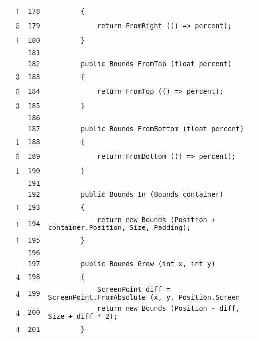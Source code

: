 \documentclass[a4paper,10pt]{article}
\begin{document}
\begin{longtable}[l]{lrrl}
\cellcolor{green} & 1 & \verb~178~ & \verb~        {~\\
\cellcolor{green} & 5 & \verb~179~ & \verb~            return FromRight (() => percent);~\\
\cellcolor{green} & 1 & \verb~180~ & \verb~        }~\\
\cellcolor{gray} &  & \verb~181~ & \verb~~\\
\cellcolor{gray} &  & \verb~182~ & \verb~        public Bounds FromTop (float percent)~\\
\cellcolor{green} & 3 & \verb~183~ & \verb~        {~\\
\cellcolor{green} & 5 & \verb~184~ & \verb~            return FromTop (() => percent);~\\
\cellcolor{green} & 3 & \verb~185~ & \verb~        }~\\
\cellcolor{gray} &  & \verb~186~ & \verb~~\\
\cellcolor{gray} &  & \verb~187~ & \verb~        public Bounds FromBottom (float percent)~\\
\cellcolor{green} & 1 & \verb~188~ & \verb~        {~\\
\cellcolor{green} & 5 & \verb~189~ & \verb~            return FromBottom (() => percent);~\\
\cellcolor{green} & 1 & \verb~190~ & \verb~        }~\\
\cellcolor{gray} &  & \verb~191~ & \verb~~\\
\cellcolor{gray} &  & \verb~192~ & \verb~        public Bounds In (Bounds container)~\\
\cellcolor{green} & 1 & \verb~193~ & \verb~        {~\\
\cellcolor{green} & 1 & \verb~194~ & \verb~            return new Bounds (Position + container.Position, Size, Padding);~\\
\cellcolor{green} & 1 & \verb~195~ & \verb~        }~\\
\cellcolor{gray} &  & \verb~196~ & \verb~~\\
\cellcolor{gray} &  & \verb~197~ & \verb~        public Bounds Grow (int x, int y)~\\
\cellcolor{green} & 4 & \verb~198~ & \verb~        {~\\
\cellcolor{green} & 4 & \verb~199~ & \verb~            ScreenPoint diff = ScreenPoint.FromAbsolute (x, y, Position.Screen~\\
\cellcolor{green} & 4 & \verb~200~ & \verb~            return new Bounds (Position - diff, Size + diff * 2);~\\
\cellcolor{green} & 4 & \verb~201~ & \verb~        }~\\

\end{longtable}
\end{document}
